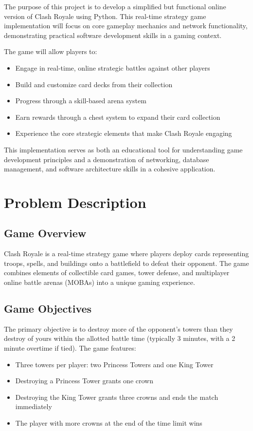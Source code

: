 \documentclass{article}
\begin{document}
The purpose of this project is to develop a simplified but functional online version of Clash Royale using Python. This real-time strategy game implementation will focus on core gameplay mechanics and network functionality, demonstrating practical software development skills in a gaming context.

\noindent The game will allow players to:
\begin{itemize}
    \item Engage in real-time, online strategic battles against other players
    \item Build and customize card decks from their collection
    \item Progress through a skill-based arena system
    \item Earn rewards through a chest system to expand their card collection
    \item Experience the core strategic elements that make Clash Royale engaging
\end{itemize}

\noindent This implementation serves as both an educational tool for understanding game development principles and a demonstration of networking, database management, and software architecture skills in a cohesive application.

\section{Problem Description}

\subsection{Game Overview}
Clash Royale is a real-time strategy game where players deploy cards representing troops, spells, and buildings onto a battlefield to defeat their opponent. The game combines elements of collectible card games, tower defense, and multiplayer online battle arenas (MOBAs) into a unique gaming experience.

\subsection{Game Objectives}
The primary objective is to destroy more of the opponent's towers than they destroy of yours within the allotted battle time (typically 3 minutes, with a 2 minute overtime if tied). The game features:
\begin{itemize}
    \item Three towers per player: two Princess Towers and one King Tower
    \item Destroying a Princess Tower grants one crown
    \item Destroying the King Tower grants three crowns and ends the match immediately
    \item The player with more crowns at the end of the time limit wins
\end{itemize}
\end{document}
